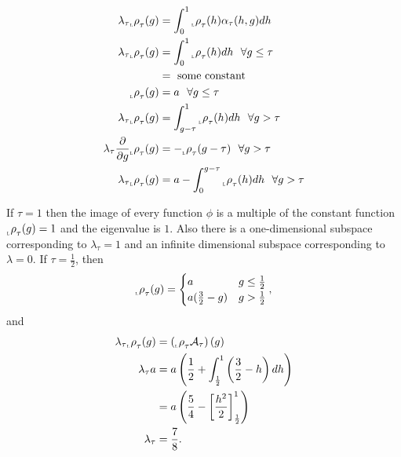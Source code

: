 \documentclass[12pt]{article} \usepackage{amsmath,amsfonts}
\newcommand{\Aop}{{\cal A}}
\newcommand{\Aindicate}{\alpha}
\newcommand{\function}{\phi}
\newcommand{\leftfunction}{{_{_{\scalebox{.4}{L}}} \rho}}
\begin{document}
\begin{align*}
  \lambda_\tau \leftfunction_\tau(g) &= \int_0^1 \leftfunction_\tau(h)
                             \Aindicate_\tau(h,g) dh \\
  \lambda_\tau \leftfunction_\tau(g) &= \int_0^1 \leftfunction_\tau(h)
                             dh ~~\forall g
                             \leq \tau \\
  &= \text{ some constant } \\
  \leftfunction_\tau(g) &= a ~~\forall g \leq \tau \\
  \lambda_\tau \leftfunction_\tau(g) &= \int_{g-\tau}^1 \leftfunction_\tau(h) dh ~~\forall
  g > \tau\\
  \lambda_\tau \frac{\partial}{\partial g} \leftfunction_\tau(g) &=
            - \leftfunction_\tau(g-\tau)~~\forall g > \tau \\
  \lambda_\tau \leftfunction_\tau(g) &= a - \int_0^{g-\tau} \leftfunction_\tau(h) dh ~~\forall
  g > \tau\\
\end{align*}

If $\tau = 1$ then the image of every function $\function$ is a
multiple of the constant function $\leftfunction_\tau(g) = 1$ and the
eigenvalue is $1$.  Also there is a one-dimensional subspace
corresponding to $\lambda_\tau=1$ and an infinite dimensional subspace
corresponding to $\lambda=0$.  If $\tau = \frac{1}{2}$, then
\begin{equation*}
  \leftfunction_\tau(g) =
  \begin{cases}
    a & g \leq \frac{1}{2} \\
    a(\frac{3}{2} -g) & g > \frac{1}{2}
  \end{cases},
\end{equation*}
and
\begin{align*}
  \lambda_\tau \leftfunction_\tau (g) &= \left( \leftfunction_\tau \Aop_\tau \right) (g) \\
  \lambda_\tau a &= a \left( \frac{1}{2} + \int_{\frac{1}{2}}^1
              \left( \frac{3}{2} - h \right) dh \right) \\
  &= a \left( \frac{5}{4} - \left[ \frac{h^2}{2}
    \right]_{\frac{1}{2}}^1 \right)\\
  \lambda_\tau &= \frac{7}{8}.
\end{align*}
\end{document}
